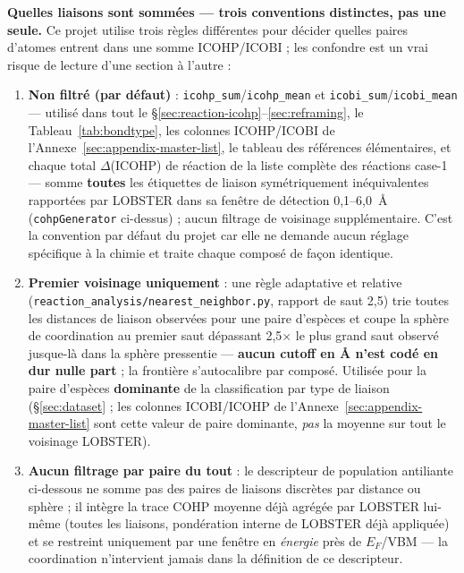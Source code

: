 \documentclass[11pt,a4paper]{article}
\begin{document}
\textbf{Quelles liaisons sont sommées --- trois conventions distinctes,
pas une seule.} Ce projet utilise trois règles différentes pour décider
quelles paires d'atomes entrent dans une somme ICOHP/ICOBI ; les
confondre est un vrai risque de lecture d'une section à l'autre :
\begin{enumerate}
\item \textbf{Non filtré (par défaut)} : \texttt{icohp\_sum}/\texttt{icohp\_mean}
  et \texttt{icobi\_sum}/\texttt{icobi\_mean} --- utilisé dans tout le
  \S\ref{sec:reaction-icohp}--\ref{sec:reframing}, le
  Tableau~\ref{tab:bondtype}, les colonnes \og{}ICOHP\fg{}/\og{}ICOBI\fg{}
  de l'Annexe~\ref{sec:appendix-master-list}, le tableau des références
  élémentaires, et chaque total $\Delta$(ICOHP) de réaction de la liste
  complète des réactions case-1 --- somme \textbf{toutes} les étiquettes
  de liaison symétriquement inéquivalentes rapportées par LOBSTER dans sa
  fenêtre de détection 0,1--6,0~\AA{} (\texttt{cohpGenerator} ci-dessus) ;
  aucun filtrage de voisinage supplémentaire. C'est la convention par
  défaut du projet car elle ne demande aucun réglage spécifique à la
  chimie et traite chaque composé de façon identique.
\item \textbf{Premier voisinage uniquement} : une règle adaptative et
  relative (\texttt{reaction\_analysis/nearest\_neighbor.py}, rapport de
  saut 2,5) trie toutes les distances de liaison observées pour une paire
  d'espèces et coupe la sphère de coordination au premier saut dépassant
  2,5$\times$ le plus grand saut observé jusque-là dans la sphère
  pressentie --- \textbf{aucun cutoff en \AA{} n'est codé en dur nulle
  part} ; la frontière s'autocalibre par composé. Utilisée pour la paire
  d'espèces \textbf{dominante} de la classification par type de liaison
  (\S\ref{sec:dataset} ; les colonnes \og{}ICOBI\fg{}/\og{}ICOHP\fg{} de
  l'Annexe~\ref{sec:appendix-master-list} sont cette valeur de paire
  dominante, \emph{pas} la moyenne sur tout le voisinage LOBSTER).
\item \textbf{Aucun filtrage par paire du tout} : le descripteur de
  population antiliante ci-dessous ne somme pas des paires de liaisons
  discrètes par distance ou sphère ; il intègre la trace COHP \og{}moyenne\fg{}
  déjà agrégée par LOBSTER lui-même (toutes les liaisons, pondération
  interne de LOBSTER déjà appliquée) et se restreint uniquement par une
  fenêtre en \emph{énergie} près de $E_F$/VBM --- la coordination
  n'intervient jamais dans la définition de ce descripteur.
\end{enumerate}
\end{document}
